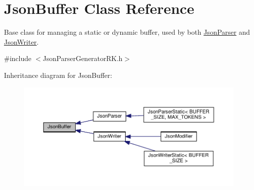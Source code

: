 \hypertarget{class_json_buffer}{}\section{Json\+Buffer Class Reference}
\label{class_json_buffer}


Base class for managing a static or dynamic buffer, used by both \hyperlink{class_json_parser}{Json\+Parser} and \hyperlink{class_json_writer}{Json\+Writer}.  




{\ttfamily \#include $<$Json\+Parser\+Generator\+R\+K.\+h$>$}



Inheritance diagram for Json\+Buffer\+:
\nopagebreak
\begin{figure}[H]
\begin{center}
\leavevmode
\includegraphics[width=350pt]{class_json_buffer__inherit__graph}
\end{center}
\end{figure}
